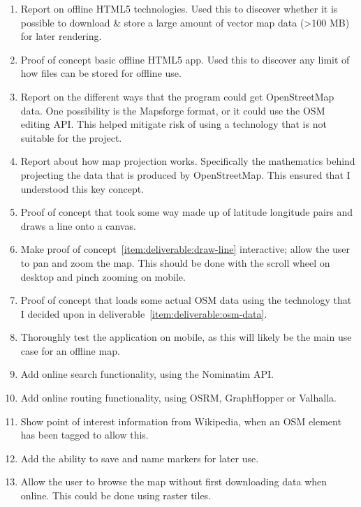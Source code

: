 \documentclass{final_report}
\begin{document}
\begin{enumerate}
    \item Report on offline HTML5 technologies. Used this to discover whether it is possible to download \& store a large amount of vector map data (>100 MB) for later rendering.\label{item:deliverable:offline-html}
    \item Proof of concept basic offline HTML5 app. Used this to discover any limit of how files can be stored for offline use.\label{item:deliverable:basic-offline-app}
    \item Report on the different ways  that the program could get OpenStreetMap data. One possibility is the Mapsforge format, or it could use the OSM editing API\@. This helped mitigate risk of using a technology that is not suitable for the project.\label{item:deliverable:osm-data}
    \item Report about how map projection works. Specifically the mathematics behind projecting the data that is produced by OpenStreetMap. This ensured that I understood this key concept.\label{item:deliverable:map-projection}
    \item Proof of concept that took some way made up of latitude longitude pairs and draws a line onto a canvas.\label{item:deliverable:draw-line}
    \item Make proof of concept~\ref{item:deliverable:draw-line} interactive; allow the user to pan and zoom the map. This should be done with the scroll wheel on desktop and pinch zooming on mobile.\label{item:deliverable:pan-zoom}
    \item Proof of concept that loads some actual OSM data using the technology that I decided upon in deliverable~\ref{item:deliverable:osm-data}.\label{item:deliverable:load-osm-data}
    \item Thoroughly test the application on mobile, as this will likely be the main use case for an offline map.\label{item:deliverable:mobile-testing}
    \item Add online search functionality, using the Nominatim API.\label{item:deliverable:search}
    \item Add online routing functionality, using OSRM, GraphHopper or Valhalla.\label{item:deliverable:routing}
    \item Show point of interest information from Wikipedia, when an OSM element has been tagged to allow this.\label{item:deliverable:wikipedia}
    \item Add the ability to save and name markers for later use.\label{item:deliverable:markers}
    \item Allow the user to browse the map without first downloading data when online. This could be done using raster tiles.\label{item:deliverable:online}
\end{enumerate}
\end{document}
